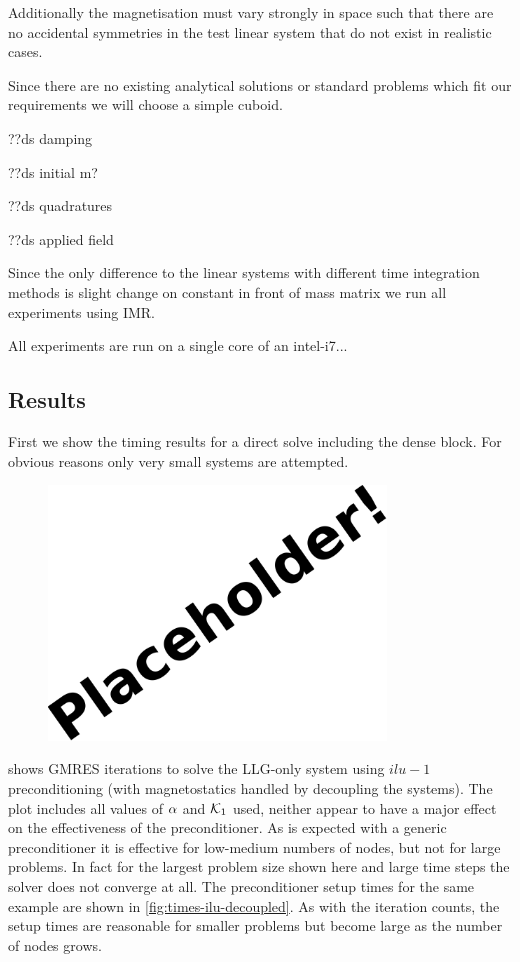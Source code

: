 Additionally the magnetisation must vary strongly in space such that there are no accidental symmetries in the test linear system that do not exist in realistic cases.  

Since there are no existing analytical solutions or standard problems which fit our requirements we will choose a simple cuboid.

??ds damping

??ds initial m?

??ds quadratures

??ds applied field

Since the only difference to the linear systems with different time integration methods is slight change on constant in front of mass matrix we run all experiments using IMR.


All experiments are run on a single core of an intel-i7...


\subsection{Results}

First we show the timing results for a direct solve including the dense block. 
For obvious reasons only very small systems are attempted.

\begin{figure}
  \centering
  \includegraphics[width=0.8\textwidth]{images/placeholder}
  \caption{}
  \label{fig:times-full-direct-bem-solve}
\end{figure}



 shows GMRES iterations to solve the LLG-only system using $ilu-1$ preconditioning (with magnetostatics handled by decoupling the systems).
The plot includes all values of $\alpha$ and $\mathcal{K}_1$ used, neither appear to have a major effect on the effectiveness of the preconditioner. 
As is expected with a generic preconditioner it is effective for low-medium numbers of nodes, but not for large problems.
In fact for the largest problem size shown here and large time steps the solver does not converge at all.
The preconditioner setup times for the same example are shown in \cref{fig:times-ilu-decoupled}.
As with the iteration counts, the setup times are reasonable for smaller problems but become large as the number of nodes grows.

